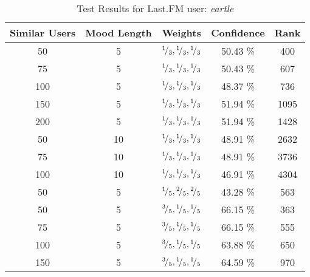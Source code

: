 \begin{table}[h!]
\centering
\begin{tabular}{ | c | c | c || c | c | }
\hline
Similar Users	& Mood Length	& Weights							&Confidence	&Rank\\
\hline \hline
50			& 5			& \({}^{1}\!/_{3}, {}^{1}\!/_{3}, {}^{1}\!/_{3}\)	&50.43 \%		&400\\
\hline
75			& 5			& \({}^{1}\!/_{3}, {}^{1}\!/_{3}, {}^{1}\!/_{3}\)	&50.43 \%		&607\\
\hline
100			& 5			& \({}^{1}\!/_{3}, {}^{1}\!/_{3}, {}^{1}\!/_{3}\)	&48.37 \%		&736\\
\hline
150			& 5			& \({}^{1}\!/_{3}, {}^{1}\!/_{3}, {}^{1}\!/_{3}\)	&51.94 \%		&1095\\
\hline
200			& 5			& \({}^{1}\!/_{3}, {}^{1}\!/_{3}, {}^{1}\!/_{3}\)	&51.94 \%		&1428\\
\hline
50			& 10			& \({}^{1}\!/_{3}, {}^{1}\!/_{3}, {}^{1}\!/_{3}\)	&48.91 \%		&2632\\
\hline
75			& 10			& \({}^{1}\!/_{3}, {}^{1}\!/_{3}, {}^{1}\!/_{3}\)	&48.91 \%		&3736\\
\hline
100			& 10			& \({}^{1}\!/_{3}, {}^{1}\!/_{3}, {}^{1}\!/_{3}\)	&46.91 \%		&4304\\
\hline
50			& 5			& \({}^{1}\!/_{5}, {}^{2}\!/_{5}, {}^{2}\!/_{5}\)	&43.28 \%		&563\\
\hline
50			& 5			& \({}^{3}\!/_{5}, {}^{1}\!/_{5}, {}^{1}\!/_{5}\)	&66.15 \%		&363\\
\hline
75			& 5			& \({}^{3}\!/_{5}, {}^{1}\!/_{5}, {}^{1}\!/_{5}\)	&66.15 \%		&555\\
\hline
100			& 5			& \({}^{3}\!/_{5}, {}^{1}\!/_{5}, {}^{1}\!/_{5}\)	&63.88 \%		&650\\
\hline
150			& 5			& \({}^{3}\!/_{5}, {}^{1}\!/_{5}, {}^{1}\!/_{5}\)	&64.59 \%		&970\\
\hline
\end{tabular}
\caption{Test Results for Last.FM user: \emph{eartle}}
\label{table:test_results_eartle}
\end{table}

